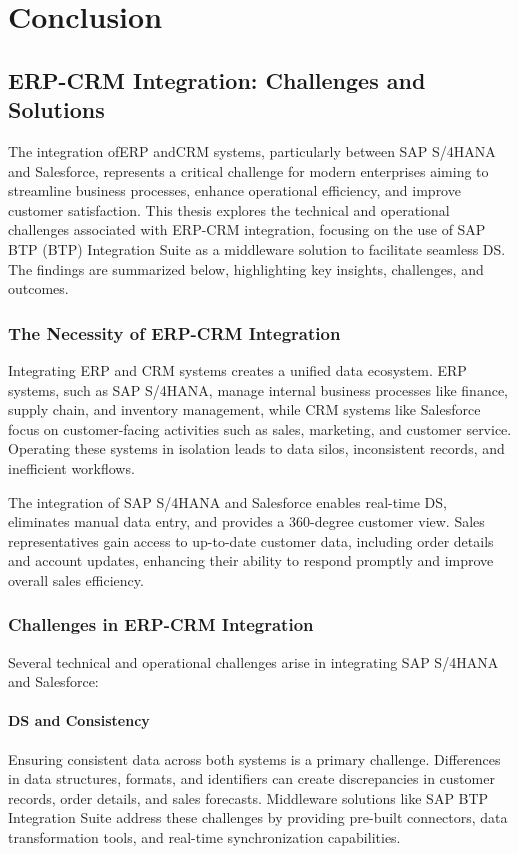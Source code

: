 
\chapter{Conclusion}


\section{ERP-CRM Integration: Challenges and Solutions}

The integration ofERP andCRM systems, particularly between SAP S/4HANA and Salesforce, represents a critical challenge for modern enterprises aiming to streamline business processes, enhance operational efficiency, and improve customer satisfaction. This thesis explores the technical and operational challenges associated with ERP-CRM integration, focusing on the use of SAP BTP (BTP) Integration Suite as a middleware solution to facilitate seamless DS. The findings are summarized below, highlighting key insights, challenges, and outcomes.

\subsection{The Necessity of ERP-CRM Integration}
Integrating ERP and CRM systems creates a unified data ecosystem. ERP systems, such as SAP S/4HANA, manage internal business processes like finance, supply chain, and inventory management, while CRM systems like Salesforce focus on customer-facing activities such as sales, marketing, and customer service. Operating these systems in isolation leads to data silos, inconsistent records, and inefficient workflows. 

The integration of SAP S/4HANA and Salesforce enables real-time DS, eliminates manual data entry, and provides a 360-degree customer view. Sales representatives gain access to up-to-date customer data, including order details and account updates, enhancing their ability to respond promptly and improve overall sales efficiency.

\subsection{Challenges in ERP-CRM Integration}
Several technical and operational challenges arise in integrating SAP S/4HANA and Salesforce:

\subsubsection{DS and Consistency}
Ensuring consistent data across both systems is a primary challenge. Differences in data structures, formats, and identifiers can create discrepancies in customer records, order details, and sales forecasts. Middleware solutions like SAP BTP Integration Suite address these challenges by providing pre-built connectors, data transformation tools, and real-time synchronization capabilities.

